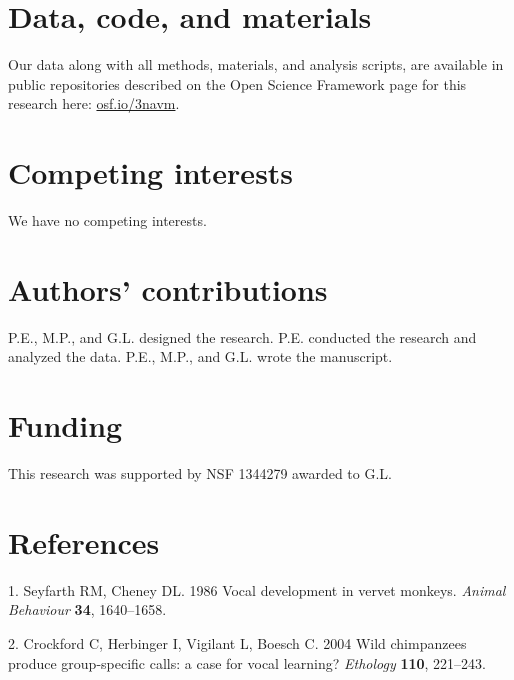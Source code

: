 \documentclass[english,floatsintext,man]{apa6}
\newcounter{author}
\theoremstyle{definition}
\theoremstyle{definition}
\theoremstyle{definition}
\theoremstyle{remark}
\begin{document}
\hypertarget{data-code-and-materials}{%
\section{Data, code, and materials}\label{data-code-and-materials}}

Our data along with all methods, materials, and analysis scripts, are
available in public repositories described on the Open Science Framework
page for this research here: \href{https://osf.io/3navm}{osf.io/3navm}.

\hypertarget{competing-interests}{%
\section{Competing interests}\label{competing-interests}}

We have no competing interests.

\hypertarget{authors-contributions}{%
\section{Authors' contributions}\label{authors-contributions}}

P.E., M.P., and G.L. designed the research. P.E. conducted the research
and analyzed the data. P.E., M.P., and G.L. wrote the manuscript.

\hypertarget{funding}{%
\section{Funding}\label{funding}}

This research was supported by NSF 1344279 awarded to G.L.

\hypertarget{references}{%
\section{References}\label{references}}

\setlength{\parindent}{-0.5in}
\setlength{\leftskip}{0.5in}

\hypertarget{refs}{}
\leavevmode\hypertarget{ref-Seyfarth:1986tw}{}%
1. Seyfarth RM, Cheney DL. 1986 Vocal development in vervet monkeys.
\emph{Animal Behaviour} \textbf{34}, 1640--1658.

\leavevmode\hypertarget{ref-Crockford:2004cz}{}%
2. Crockford C, Herbinger I, Vigilant L, Boesch C. 2004 Wild chimpanzees
produce group-specific calls: a case for vocal learning? \emph{Ethology}
\textbf{110}, 221--243.
\end{document}
